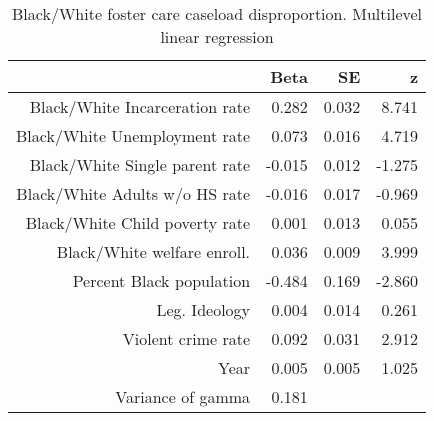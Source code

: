 \begin{table}[ht]
\centering
\caption{Black/White foster care caseload disproportion. Multilevel linear regression} 
\label{b.d.tab}
\begin{tabular}{rrrr}
  \hline
 & Beta & SE & z \\ 
  \hline
Black/White Incarceration rate & 0.282 & 0.032 & 8.741 \\ 
  Black/White Unemployment rate & 0.073 & 0.016 & 4.719 \\ 
  Black/White Single parent rate & -0.015 & 0.012 & -1.275 \\ 
  Black/White Adults w/o HS rate & -0.016 & 0.017 & -0.969 \\ 
  Black/White Child poverty rate & 0.001 & 0.013 & 0.055 \\ 
  Black/White welfare enroll.  & 0.036 & 0.009 & 3.999 \\ 
  Percent Black population & -0.484 & 0.169 & -2.860 \\ 
  Leg. Ideology & 0.004 & 0.014 & 0.261 \\ 
  Violent crime rate & 0.092 & 0.031 & 2.912 \\ 
  Year & 0.005 & 0.005 & 1.025 \\ 
  Variance of gamma & 0.181 &  &  \\ 
   \hline
\end{tabular}
\end{table}
